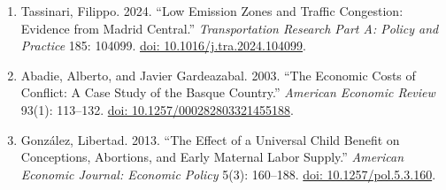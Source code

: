\documentclass[12pt]{article}
\begin{document}
{\begin{enumerate}[leftmargin=*]
    \item Tassinari, Filippo. 2024. ``Low Emission Zones and Traffic Congestion: Evidence from Madrid Central.'' \emph{Transportation Research Part A: Policy and Practice} 185: 104099. \href{https://doi.org/10.1016/j.tra.2024.104099}{doi: 10.1016/j.tra.2024.104099}.

    \item Abadie, Alberto, and Javier Gardeazabal. 2003. ``The Economic Costs of Conflict: A Case Study of the Basque Country.'' \emph{American Economic Review} 93(1): 113--132. \href{https://doi.org/10.1257/000282803321455188}{doi: 10.1257/000282803321455188}.

    \item Gonz\'alez, Libertad. 2013. ``The Effect of a Universal Child Benefit on Conceptions, Abortions, and Early Maternal Labor Supply.'' \emph{American Economic Journal: Economic Policy} 5(3): 160--188. \href{https://doi.org/10.1257/pol.5.3.160}{doi: 10.1257/pol.5.3.160}.

\end{enumerate}
\par}
\end{document}
